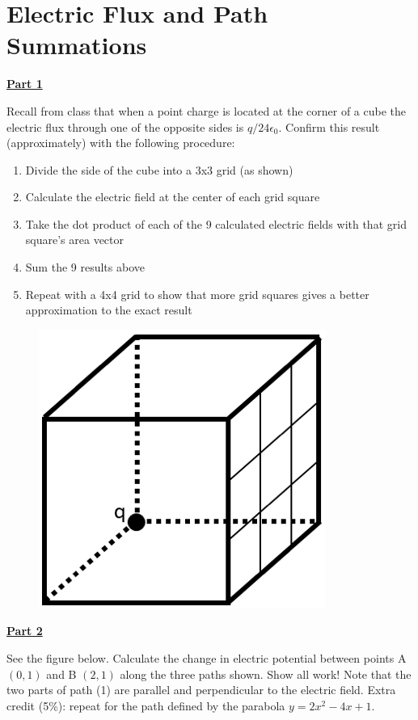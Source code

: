 \section{Electric Flux and Path Summations}

\underline{\textbf{Part 1}} \par
Recall from class that when a point charge is located at the corner of a cube the electric flux through one of the opposite sides is $q / 24 \epsilon_0$.
Confirm this result (approximately) with the following procedure:

\begin{enumerate}
\item Divide the side of the cube into a 3x3 grid (as shown)
\item Calculate the electric field at the center of each grid square
\item Take the dot product of each of the 9 calculated electric fields with that grid square's area vector
\item Sum the 9 results above
\item Repeat with a 4x4 grid to show that more grid squares gives a better approximation to the exact result
\end{enumerate}

\begin{figure}[H]
\includegraphics[scale=1.0]{figures/electric-flux-and-path-integral/fig1.png}
\end{figure}

\underline{\textbf{Part 2}} \par

See the figure below.
Calculate the change in electric potential between points A $(0, 1)$ and B $(2, 1)$ along the three paths shown.
Show all work!
Note that the two parts of path (1) are parallel and perpendicular to the electric field.
Extra credit (5\%): repeat for the path defined by the parabola $y = 2x^2 - 4x + 1$.

